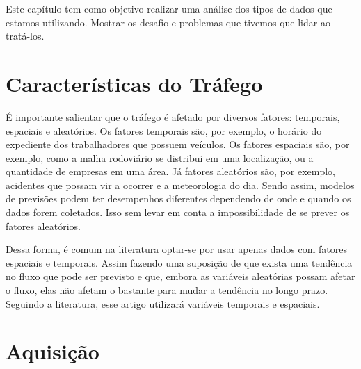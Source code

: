 






Este capítulo tem como objetivo realizar uma análise dos tipos de dados que estamos utilizando. Mostrar os desafio e problemas que tivemos que lidar ao tratá-los.

\section{Características do Tráfego}

É importante salientar que o tráfego é afetado por diversos fatores: temporais, espaciais e aleatórios. Os fatores temporais são, por exemplo, o horário do expediente dos trabalhadores que possuem veículos. Os fatores espaciais são, por exemplo, como a malha rodoviário se distribui em uma localização, ou a quantidade de empresas em uma área. Já fatores aleatórios são, por exemplo, acidentes que possam vir a ocorrer e a meteorologia do dia. Sendo assim, modelos de previsões podem ter desempenhos diferentes dependendo de onde e quando os dados forem coletados. Isso sem levar em conta a impossibilidade de se prever os fatores aleatórios.

Dessa forma, é comum na literatura optar-se por usar apenas dados com fatores espaciais e temporais. Assim fazendo uma suposição de que exista uma tendência no fluxo que pode ser previsto e que, embora as variáveis aleatórias possam afetar o fluxo, elas não afetam o bastante para mudar a tendência no longo prazo. Seguindo a literatura, esse artigo utilizará variáveis temporais e espaciais.


\section{Aquisição}

